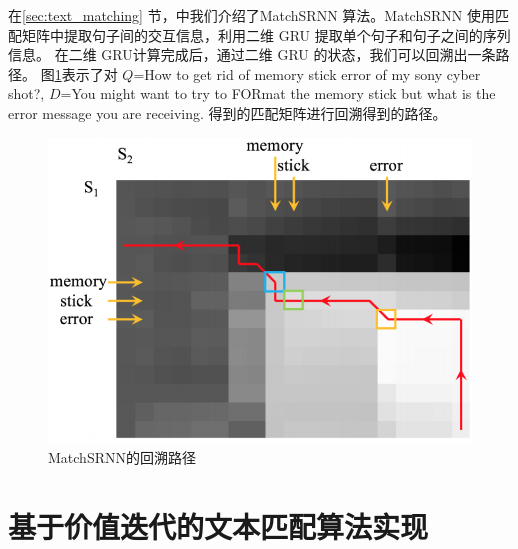 在\ref{sec:text_matching} 节，中我们介绍了MatchSRNN\cite{Wan2016MatchSRNNMT} 算法。MatchSRNN 使用匹配矩阵中提取句子间的交互信息，利用二维 GRU 提取单个句子和句子之间的序列信息。 在二维 GRU计算完成后，通过二维 GRU 的状态，我们可以回溯出一条路径。
图\ref{fig:LD_dis}表示了对 $Q$=How to get rid of memory stick error of my
sony cyber shot?, $D$=You might want to try to FORmat the memory
stick but what is the error message you are receiving. 得到的匹配矩阵进行回溯得到的路径。

\begin{figure}[!htbp]\centering
\vspace{1em}
  \includegraphics[width=0.6\linewidth]{figures/LD_dis}
  \caption{MatchSRNN的回溯路径} 
  \label{fig:LD_dis}       %
  \vspace{1em}
\end{figure}



\chapter{基于价值迭代的文本匹配算法实现}


